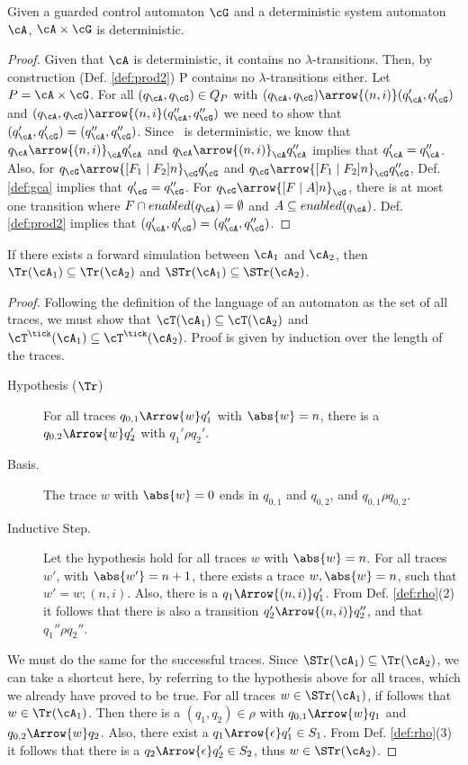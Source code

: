 \begin{proposition}
Given a guarded control automaton $\cG$ and a deterministic system automaton $\cA$, $\cA \times \cG$ is deterministic. 
\end{proposition}
%
\begin{proof}
Given that $\cA$ is deterministic, it contains no $\lambda$-transitions. Then, by construction (Def. \ref{def:prod2}) P contains no $\lambda$-transitions either.
Let $P = \cA \times \cG$. For all $(q_{\cA},q_{\cG}) \in Q_P$ with $(q_{\cA},q_{\cG}) \arrow{(n,i)} (q_{\cA}',q_{\cG}')$ and $(q_{\cA},q_{\cG}) \arrow{(n,i} (q_{\cA}'',q_{\cG}'')$ we need to show that $(q_{\cA}',q_{\cG}') = (q_{\cA}'',q_{\cG}'')$. Since \cA~is deterministic, we know that $q_{\cA} \arrow{(n,i)}_{\cA} q_{\cA}'$ and $q_{\cA} \arrow{(n,i)}_{\cA} q_{\cA}''$ implies that $q_{\cA}' = q_{\cA}''$. Also, for $q_{\cG} \arrow{[F_1 \mid F_2] n}_{\cG} q_{\cG}'$ and $q_{\cG} \arrow{[F_1 \mid F_2] n}_{\cG} q_{\cG}''$, Def. \ref{def:gca} implies that $q_{\cG}' = q_{\cG}''$. 
For $q_{\cG} \arrow{[F \mid A] n}_{\cG}$, there is at most one transition where $F \cap enabled(q_{\cA}) = \emptyset$ and $A \subseteq enabled(q_{\cA})$. Def. \ref{def:prod2} implies that $(q_{\cA}',q_{\cG}') = (q_{\cA}'',q_{\cG}'')$.
\end{proof}
%
\begin{proposition}
If there exists a forward simulation between $\cA_1$ and $\cA_2$, then $\Tr(\cA_1) \subseteq \Tr(\cA_2)$ and $\STr(\cA_1) \subseteq \STr(\cA_2)$.
\end{proposition}
%
\begin{proof}
Following the definition of the language of an automaton as the set of all traces, we must show that $\cT(\cA_1) \subseteq \cT(\cA_2)$ and $\cT^\tick(\cA_1) \subseteq \cT^\tick(\cA_2)$. Proof is given by induction over the length of the traces.
\begin{description}
\item[Hypothesis ($\Tr$)] For all traces $q_{0,1} \Arrow{w} q_1'$ with $\abs{w} = n$, there is a $q_{0,2} \Arrow{w} q_2'$ with $q_1' \rho q_2'$.
\item[Basis.] The trace $w$ with $\abs{w} = 0$ ends in $q_{0,1}$ and $q_{0,2}$, and $q_{0,1} \rho q_{0,2}$.
\item[Inductive Step.] Let the hypothesis hold for all traces $w$ with $\abs{w} = n$. For all traces $w'$, with $\abs{w'} = n+1$, there exists a trace $w, \abs{w} = n$, such that $w' = w;(n,i)$. Also, there is a $q_1 \Arrow{(n,i)} q_1'$. From Def. \ref{def:rho}(2) it follows that there is also a transition $q_{2}' \Arrow{(n,i)} q_2''$, and that $q_1'' \rho q_2''$.
\end{description}
We must do the same for the successful traces. Since $\STr(\cA_1) \subseteq \Tr(\cA_2)$, we can take a shortcut here, by referring to the hypothesis above for all traces, which we already have proved to be true. For all traces $w \in \STr(\cA_1)$, if follows that $w \in \Tr(\cA_1)$. Then there is a $(q_1, q_2) \in \rho$ with $q_{0,1} \Arrow{w} q_1$ and $q_{0,2} \Arrow{w} q_2$. Also, there exist a $q_1 \Arrow{\epsilon} q_1' \in S_1$. From Def. \ref{def:rho}(3) it follows that there is a $q_2 \Arrow{\epsilon} q_2' \in S_2$, thus $w \in \STr(\cA_2)$.
\end{proof}
